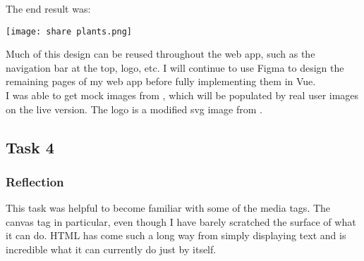 \documentclass[portfolio.tex.tex]{subfiles}
\begin{document}
					The end result was:\\


					\begin{center}
						\texttt{[image: share plants.png]}
					\end{center}

					Much of this design can be reused throughout the web app, such as the navigation bar at the top, logo, etc. I will continue to use Figma to design the remaining pages of my web app before fully implementing them in Vue.\\

					I was able to get mock images from , which will be populated by real user images on the live version. The logo is a modified svg image from .

			\subsection{Task 4}
				\subsubsection{Reflection}
					This task was helpful to become familiar with some of the media tags. The canvas tag in particular, even though I have barely scratched the surface of what it can do. HTML has come such a long way from simply displaying text and is incredible what it can currently do just by itself.\\





					\vspace{0.5cm}
\end{document}
